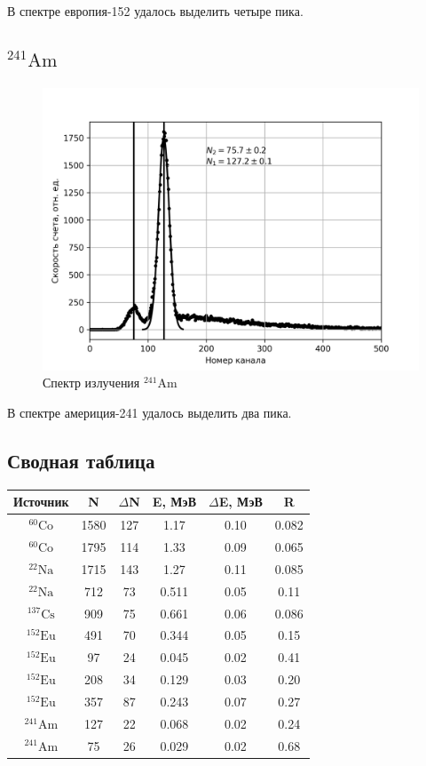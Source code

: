 \documentclass[14pt, a4paper]{report}
\begin{document}
В спектре европия-152 удалось выделить четыре пика.

\subsection{$^{241}\text{Am}$}

\begin{figure}[H]
\centering
\includegraphics[width=.7\textwidth]{../images/555-am241}
\caption{Спектр излучения $^{241}\text{Am}$}
\end{figure}

В спектре америция-241 удалось выделить два пика.

\subsection{Сводная таблица}

\begin{table}[H]
\centering
\begin{tabular}{|c|c|c|c|c|c|}
\hline
Источник & N & $\Delta$N & E, МэВ & $\Delta$E, МэВ & R \\ \hline
$^{60}\text{Co}$       & 1580  & 127 & 1.17 &0.10& 0.082\\ \hline
$^{60}\text{Co}$       & 1795  & 114 & 1.33 &0.09& 0.065\\ \hline
$^{22}\text{Na}$       & 1715  & 143 & 1.27 &0.11& 0.085\\ \hline
$^{22}\text{Na}$       & 712 & 73 & 0.511 &0.05&0.11\\ \hline
$^{137}\text{Cs}$       & 909 & 75 & 0.661 &0.06&0.086\\ \hline
$^{152}\text{Eu}$       & 491 & 70 & 0.344 &0.05&0.15\\ \hline
$^{152}\text{Eu}$       & 97 & 24 & 0.045 &0.02&0.41\\ \hline
$^{152}\text{Eu}$       & 208 & 34 & 0.129 &0.03&0.20\\ \hline
$^{152}\text{Eu}$       & 357 & 87 & 0.243 &0.07&0.27\\ \hline
$^{241}\text{Am}$       & 127 & 22& 0.068 &0.02&0.24\\ \hline
$^{241}\text{Am}$       & 75 & 26 & 0.029 &0.02&0.68\\ \hline
\end{tabular}
\end{table}
\end{document}
